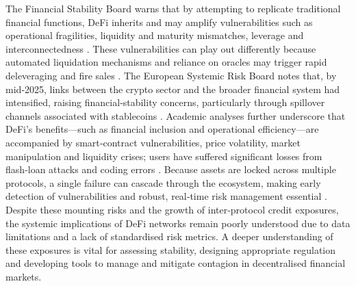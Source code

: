 The Financial Stability Board warns that by attempting to replicate traditional financial functions, DeFi inherits and may amplify vulnerabilities such as operational fragilities, liquidity and maturity mismatches, leverage and interconnectedness \cite{FSB2023}.  These vulnerabilities can play out differently because automated liquidation mechanisms and reliance on oracles may trigger rapid deleveraging and fire sales \cite{FSB2023}.  The European Systemic Risk Board notes that, by mid‑2025, links between the crypto sector and the broader financial system had intensified, raising financial‑stability concerns, particularly through spillover channels associated with stablecoins \cite{ESRB2025}.  Academic analyses further underscore that DeFi’s benefits—such as financial inclusion and operational efficiency—are accompanied by smart‑contract vulnerabilities, price volatility, market manipulation and liquidity crises; users have suffered significant losses from flash‑loan attacks and coding errors \cite{Adamyk2025}.  Because assets are locked across multiple protocols, a single failure can cascade through the ecosystem, making early detection of vulnerabilities and robust, real‑time risk management essential \cite{Adamyk2025}.  Despite these mounting risks and the growth of inter‑protocol credit exposures, the systemic implications of DeFi networks remain poorly understood due to data limitations and a lack of standardised risk metrics.  A deeper understanding of these exposures is vital for assessing stability, designing appropriate regulation and developing tools to manage and mitigate contagion in decentralised financial markets.


